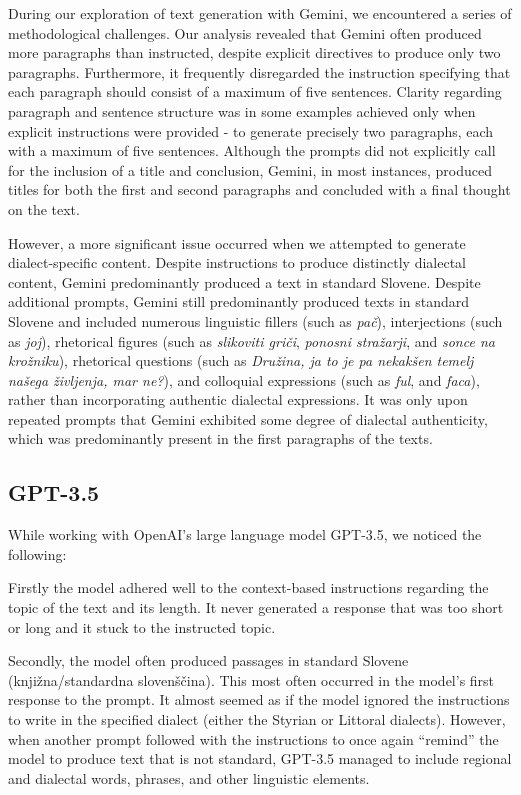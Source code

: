 \documentclass[fleqn,moreauthors,10pt]{ds_report}
\begin{document}
    During our exploration of text generation with Gemini, we encountered a series of methodological challenges. Our analysis revealed that Gemini often produced more paragraphs than instructed, despite explicit directives to produce only two paragraphs. Furthermore, it frequently disregarded the instruction specifying that each paragraph should consist of a maximum of five sentences. Clarity regarding paragraph and sentence structure was in some examples achieved only when explicit instructions were provided - to generate precisely two paragraphs, each with a maximum of five sentences. Although the prompts did not explicitly call for the inclusion of a title and conclusion, Gemini, in most instances, produced titles for both the first and second paragraphs and concluded with a final thought on the text. 

    However, a more significant issue occurred when we attempted to generate dialect-specific content. Despite instructions to produce distinctly dialectal content, Gemini predominantly produced a text in standard Slovene. Despite additional prompts, Gemini still predominantly produced texts in standard Slovene and included numerous linguistic fillers (such as \textit{pač}), interjections (such as \textit{joj}), rhetorical figures (such as \textit{slikoviti griči}, \textit{ponosni stražarji}, and \textit{sonce na krožniku}), rhetorical questions (such as \textit{Družina, ja to je pa nekakšen temelj našega življenja, mar ne?}), and colloquial expressions (such as \textit{ful}, and \textit{faca}), rather than incorporating authentic dialectal expressions. It was only upon repeated prompts that Gemini exhibited some degree of dialectal authenticity, which was predominantly present in the first paragraphs of the texts.  

\subsection{GPT-3.5}

While working with OpenAI’s large language model GPT-3.5, we noticed the following:

    Firstly the model adhered well to the context-based instructions regarding the topic of the text and its length. It never generated a response that was too short or long and it stuck to the instructed topic. 

    Secondly, the model often produced passages in standard Slovene (knjižna/standardna slovenščina). This most often occurred in the model’s first response to the prompt. It almost seemed as if the model ignored the instructions to write in the specified dialect (either the Styrian or Littoral dialects). However, when another prompt followed with the instructions to once again “remind” the model to produce text that is not standard, GPT-3.5 managed to include regional and dialectal words, phrases, and other linguistic elements. 
\end{document}
